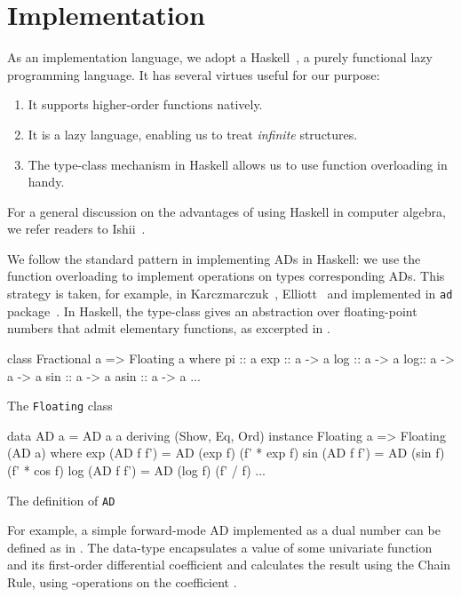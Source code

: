 \documentclass[./rims-smooth-paper.tex]{subfiles}
\begin{document}
\section{Implementation}
\label{sec:impl}
As an implementation language, we adopt a Haskell~\cite{haskell.org:2021tt}, a purely functional lazy programming language.
It has several virtues useful for our purpose:
\begin{enumerate}
\item It supports higher-order functions natively.
\item It is a lazy language, enabling us to treat \emph{infinite} structures.
\item The type-class mechanism in Haskell allows us to use function overloading in handy.
\end{enumerate}
For a general discussion on the advantages of using Haskell in computer algebra, we refer readers to Ishii~\cite{ISHII:2018ek}.

We follow the standard pattern in implementing ADs in Haskell: we use the function overloading to implement operations on types corresponding ADs.
This strategy is taken, for example, in Karczmarczuk~\cite{Karczmarczuk:2001ww}, Elliott~\cite{Elliott2009-beautiful-differentiation} and implemented in \texttt{ad} package~\cite{Kmett:2010aa}.
In Haskell, the  type-class gives an abstraction over floating-point numbers that admit elementary functions, as excerpted in .
\begin{listing}[tbp]
\begin{code}
class Fractional a => Floating a where
  pi :: a
  exp :: a -> a
  log :: a -> a
  log\base :: a -> a -> a
  sin :: a -> a
  asin :: a -> a
  ...
\end{code}
\caption{The \texttt{Floating} class\label{lst:cls-floating}}
\end{listing}
\begin{listing}[tbp]
\begin{code}
  data AD a = AD a a deriving (Show, Eq, Ord)
  instance Floating a => Floating (AD a) where
    exp (AD f f') = AD (exp f) (f' * exp f)
    sin (AD f f') = AD (sin f) (f' * cos f)
    log (AD f f') = AD (log f) (f' / f)
    ...
\end{code}
\caption{The definition of \texttt{AD}\label{lst:def-AD}}
\end{listing}

For example, a simple forward-mode AD implemented as a dual number can be defined as in .
The data-type  encapsulates a value of some univariate function and its first-order differential coefficient and calculates the result using the Chain Rule, using -operations on the coefficient .
\end{document}

